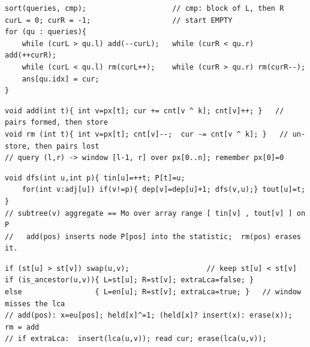\begin{lstlisting}[caption={Drill 1 -- the Mo block-order sweep (from lst:c21-mo)}]
sort(queries, cmp);                    // cmp: block of L, then R
curL = 0; curR = -1;                   // start EMPTY
for (qu : queries){
    while (curL > qu.l) add(--curL);   while (curR < qu.r) add(++curR);
    while (curL < qu.l) rm(curL++);    while (curR > qu.r) rm(curR--);
    ans[qu.idx] = cur;
}
\end{lstlisting}

\begin{lstlisting}[caption={Drill 2 -- CF 617E add/rm over prefix xors (from lst:c21-xor)}]
void add(int t){ int v=px[t]; cur += cnt[v ^ k]; cnt[v]++; }   // pairs formed, then store
void rm (int t){ int v=px[t]; cnt[v]--;  cur -= cnt[v ^ k]; }   // un-store, then pairs lost
// query (l,r) -> window [l-1, r] over px[0..n]; remember px[0]=0
\end{lstlisting}

\begin{lstlisting}[caption={Drill 3 -- subtree flatten + Mo range (from lst:c21-flatten)}]
void dfs(int u,int p){ tin[u]=++t; P[t]=u;
    for(int v:adj[u]) if(v!=p){ dep[v]=dep[u]+1; dfs(v,u);} tout[u]=t; }
// subtree(v) aggregate == Mo over array range [ tin[v] , tout[v] ] on P
//   add(pos) inserts node P[pos] into the statistic;  rm(pos) erases it.
\end{lstlisting}

\begin{lstlisting}[caption={Drill 4 -- path window + toggle (from lst:c21-euler-toggle)}]
if (st[u] > st[v]) swap(u,v);                  // keep st[u] < st[v]
if (is_ancestor(u,v)){ L=st[u]; R=st[v]; extraLca=false; }
else                 { L=en[u]; R=st[v]; extraLca=true; }   // window misses the lca
// add(pos): x=eu[pos]; held[x]^=1; (held[x]? insert(x): erase(x));   rm = add
// if extraLca:  insert(lca(u,v)); read cur; erase(lca(u,v));
\end{lstlisting}

